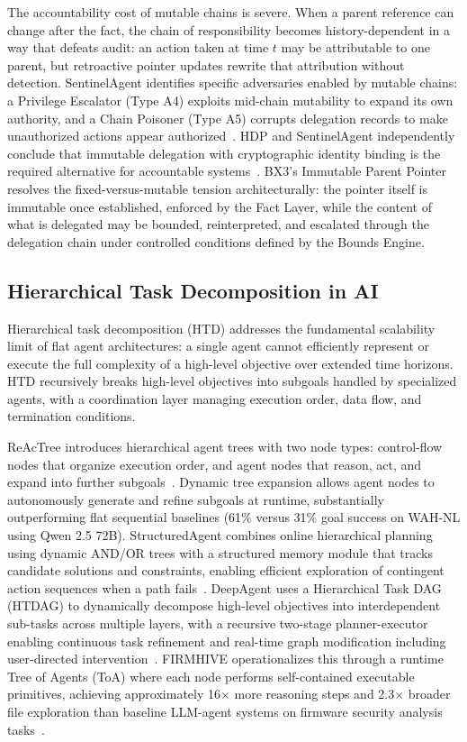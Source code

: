 The accountability cost of mutable chains is severe. When a parent reference can change after the fact, the chain of responsibility becomes history-dependent in a way that defeats audit: an action taken at time $t$ may be attributable to one parent, but retroactive pointer updates rewrite that attribution without detection. SentinelAgent identifies specific adversaries enabled by mutable chains: a Privilege Escalator (Type A4) exploits mid-chain mutability to expand its own authority, and a Chain Poisoner (Type A5) corrupts delegation records to make unauthorized actions appear authorized~\cite[Table I]{sentinelagent}. HDP and SentinelAgent independently conclude that immutable delegation with cryptographic identity binding is the required alternative for accountable systems~\cite{hdp-draft,sentinelagent}. BX3's Immutable Parent Pointer resolves the fixed-versus-mutable tension architecturally: the pointer itself is immutable once established, enforced by the Fact Layer, while the content of what is delegated may be bounded, reinterpreted, and escalated through the delegation chain under controlled conditions defined by the Bounds Engine.

\subsection{Hierarchical Task Decomposition in AI}
\label{sec:decomposition}

Hierarchical task decomposition (HTD) addresses the fundamental scalability limit of flat agent architectures: a single agent cannot efficiently represent or execute the full complexity of a high-level objective over extended time horizons. HTD recursively breaks high-level objectives into subgoals handled by specialized agents, with a coordination layer managing execution order, data flow, and termination conditions.

ReAcTree introduces hierarchical agent trees with two node types: control-flow nodes that organize execution order, and agent nodes that reason, act, and expand into further subgoals~\cite{reactree2025}. Dynamic tree expansion allows agent nodes to autonomously generate and refine subgoals at runtime, substantially outperforming flat sequential baselines (61\% versus 31\% goal success on WAH-NL using Qwen 2.5 72B). StructuredAgent combines online hierarchical planning using dynamic AND/OR trees with a structured memory module that tracks candidate solutions and constraints, enabling efficient exploration of contingent action sequences when a path fails~\cite{structuredttt2026}. DeepAgent uses a Hierarchical Task DAG (HTDAG) to dynamically decompose high-level objectives into interdependent sub-tasks across multiple layers, with a recursive two-stage planner-executor enabling continuous task refinement and real-time graph modification including user-directed intervention~\cite{deepagent2025}. FIRMHIVE operationalizes this through a runtime Tree of Agents (ToA) where each node performs self-contained executable primitives, achieving approximately 16$\times$ more reasoning steps and 2.3$\times$ broader file exploration than baseline LLM-agent systems on firmware security analysis tasks~\cite{firmhive2025}.


